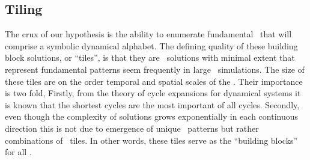 


\subsection{Tiling \statesp}
The crux of our hypothesis is the ability to
enumerate fundamental {\spt} \twots\ that will comprise
a symbolic dynamical alphabet. The defining quality
of these building block solutions, or ``tiles'',
is that they are \twot\ solutions with minimal {\spt}
extent that represent fundamental patterns seem
frequently in large \spt\ simulations.
The size of these tiles are on the order
temporal and spatial scales of the \KSe. Their importance is
two fold, Firstly,
from the theory of cycle expansions for dynamical
systems it is known that
the shortest cycles are the most important
of all cycles.
Secondly, even though the
complexity of solutions grows
exponentially in each continuous direction this is
not due to emergence of unique
\spt\ patterns but rather combinations of \spt\ tiles.
In other words, these tiles serve as the ``building blocks''
for all \twots.


